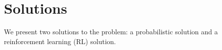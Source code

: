 \section{Solutions}
\label{sec:solutions}
%
We present two solutions to the problem: a probabilistic solution and a
reinforcement learning (RL) solution.



